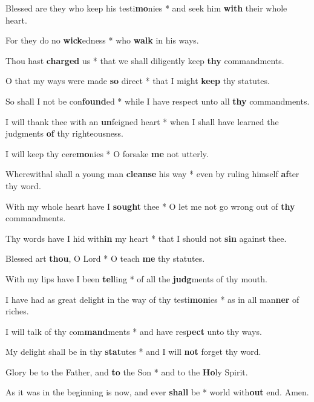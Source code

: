 \begin{multicols}{2}
	Blessed are they who keep his testi\textbf{mo}nies * and seek him \textbf{with} their whole heart.
	
	For they do no \textbf{wick}edness * who \textbf{walk} in his ways.
	
	Thou hast \textbf{charged} us * that we shall diligently keep \textbf{thy} commandments.
	
	O that my ways were made \textbf{so} direct * that I might \textbf{keep} thy statutes.
	
	So shall I not be con\textbf{found}ed * while I have respect unto all \textbf{thy} commandments.
	
	I will thank thee with an \textbf{un}feigned heart * when I shall have learned the judgments \textbf{of} thy righteousness.
	
	I will keep thy cere\textbf{mo}nies * O forsake \textbf{me} not utterly.
	
	Wherewithal shall a young man \textbf{cleanse} his way * even by ruling himself \textbf{af}ter thy word.
	
	With my whole heart have I \textbf{sought} thee * O let me not go wrong out of \textbf{thy} commandments.
	
	Thy words have I hid with\textbf{in} my heart * that I should not \textbf{sin} against thee.
	
	Blessed art \textbf{thou}, O Lord * O teach \textbf{me} thy statutes.
	
	With my lips have I been \textbf{tel}ling * of all the \textbf{judg}ments of thy mouth.
	
	I have had as great delight in the way of thy testi\textbf{mon}ies * as in all man\textbf{ner} of riches.
	
	I will talk of thy com\textbf{mand}ments * and have res\textbf{pect} unto thy ways.
	
	My delight shall be in thy \textbf{stat}utes * and I will \textbf{not} forget thy word.
	
	Glory be to the Father, and \textbf{to} the Son * and to the \textbf{Ho}ly Spirit.
	
	As it was in the beginning is now, and ever \textbf{shall} be * world with\textbf{out} end. Amen.
\end{multicols}
